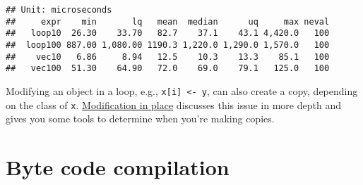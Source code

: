 \begin{Shaded}
\begin{Highlighting}[]
\StringTok{ }\NormalTok{() \{}
  \NormalTok{(}\NormalTok{, } \NormalTok{), } \NormalTok{)}
\NormalTok{\}}
\StringTok{ }\NormalTok{(}\NormalTok{, }\NormalTok{())}
\StringTok{ }\NormalTok{(}\NormalTok{, }\NormalTok{())}

\StringTok{ }
\StringTok{ }
\NormalTok{  \}}
\NormalTok{\}}

\NormalTok{(}
   
   
    \NormalTok{),}
    \NormalTok{)}
\NormalTok{)}
\end{Highlighting}
\end{Shaded}

\begin{verbatim}
## Unit: microseconds
##     expr    min       lq   mean  median      uq     max neval
##   loop10  26.30    33.70   82.7    37.1    43.1 4,420.0   100
##  loop100 887.00 1,080.00 1190.3 1,220.0 1,290.0 1,570.0   100
##    vec10   6.86     8.94   12.5    10.3    13.3    85.1   100
##   vec100  51.30    64.90   72.0    69.0    79.1   125.0   100
\end{verbatim}

Modifying an object in a loop, e.g., \texttt{x{[}i{]}\ \textless{}-\ y},
can also create a copy, depending on the class of \texttt{x}.
\protect\hyperlink{modification}{Modification in place} discusses this
issue in more depth and gives you some tools to determine when you're
making copies.

\hypertarget{byte-code}{%
\section{Byte code compilation}\label{byte-code}}

